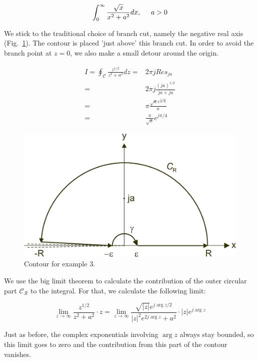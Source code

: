 \begin{equation}
\int_0^{\infty}\frac{\sqrt{x}}{x^2+a^2}dx, \hspace{0.5cm} a > 0
\end{equation}

We stick to the traditional choice of branch cut, namely the negative real axis
(Fig.~\ref{fig-example-3}). The contour is placed 'just above' this branch cut. In order to avoid
the branch point at $z=0$, we also make a small detour around the origin.

\begin{align}
I = \oint_{\mathcal{C}} \frac{z^{1/2}}{z^2+a^2} dz =& 2 \pi j Res_{j a}
\nonumber \\
=& 2 \pi j \frac{(j a)^{1/2}}{ja + ja} \nonumber \\
=& \pi \frac{\sqrt{a}e^{\frac{1}{2}j\frac{\pi}{2}}}{a} \nonumber \\
=& \frac{\pi}{\sqrt{a}} e^{j \pi /4}
\end{align}

\begin{figure}
\centering
\includegraphics{complex/figures/int_ex_3}
\caption{Contour for example 3.}
\label{fig-example-3}
\end{figure}

We use the big limit theorem to calculate the contribution of the outer circular
part $\mathcal{C_R}$ to the integral. For that, we calculate the following
limit:

\begin{equation}
\lim_{z \to \infty}\frac{z^{1/2}}{z^2+a^2} \cdot z = \lim_{z \to
\infty}\frac{\sqrt{|z|}e^{j \arg z / 2}}{|z|^2 e^{2 j \arg z}+a^2} \cdot |z|
e^{j \arg z}
\end{equation}

Just as before, the complex exponentials involving $\arg z$ always stay bounded,
so this limit goes to zero and the contribution from this part of the contour
vanishes.

